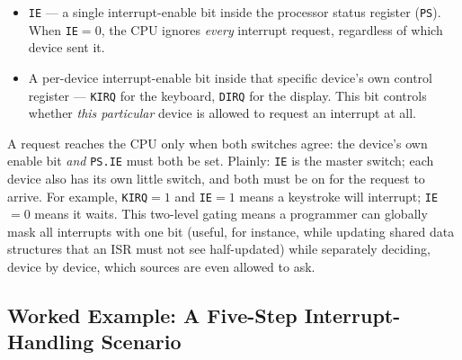 \documentclass[11pt]{article}
\begin{document}
\begin{itemize}
  \item \texttt{IE} --- a single interrupt-enable bit inside the processor status register (\texttt{PS}). When \texttt{IE}$=0$, the CPU ignores \emph{every} interrupt request, regardless of which device sent it.
  \item A per-device interrupt-enable bit inside that specific device's own control register --- \texttt{KIRQ} for the keyboard, \texttt{DIRQ} for the display. This bit controls whether \emph{this particular} device is allowed to request an interrupt at all.
\end{itemize}

A request reaches the CPU only when both switches agree: the device's own enable bit \emph{and} \texttt{PS.IE} must both be set. Plainly: \texttt{IE} is the master switch; each device also has its own little switch, and both must be on for the request to arrive. For example, \texttt{KIRQ}$=1$ and \texttt{IE}$=1$ means a keystroke will interrupt; \texttt{IE}$=0$ means it waits. This two-level gating means a programmer can globally mask all interrupts with one bit (useful, for instance, while updating shared data structures that an ISR must not see half-updated) while separately deciding, device by device, which sources are even allowed to ask.

\subsection{Worked Example: A Five-Step Interrupt-Handling Scenario}
\end{document}
